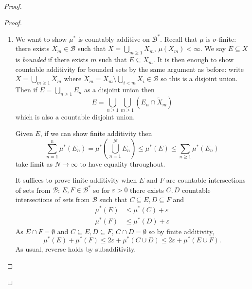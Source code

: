 \documentclass[a4paper]{article}
\begin{document}
\begin{proof}
\begin{proof}
\begin{enumerate}
\begin{proof}
          Now for the actual lemma, let \(E = \bigcap_{n \geq 1} I_n\) where \(I_n \in \mathcal B\). wlog we may assume \(I_{n + 1} \subseteq I_n\). By \(\sigma\)-finiteness assumption, \(X = \bigcup_{m \geq 1} X_m\) where \(X_m \in \mathcal B\) with \(\mu(X_m) < \infty\) so
          \[
            E = \bigcup_{m \geq 1} E \cap X_m.
          \]
          By the claim for all \(m\), \(E \cap X_m \in \mathcal B^*\) so \(E \in \mathcal B^*\).
      \end{proof}
      From the lemma we can derive that \(\mathcal B^*\) is also stable under complementation: given \(E \in \mathcal B^*\), for all \(n\) there exist \(C_n = \bigcup_{i \geq 1} B_{n, i}\) where \(B_{n, i} \in \mathcal B\) such that \(E \subseteq C_n\) and \(\mu^*(C_n \setminus E) \leq \frac{1}{n}\). Now
      \[
        E^c = (\bigcup_{n \geq 1} C_n^c) \cup (E^c \setminus \bigcup_{n \geq 1} C_n^c)
      \]
      but \(C_n^c\) is a countable intersection \(\bigcap_{i \geq 1} B_{n, i}^c\) and \(E^c \setminus \bigcup_{n \geq 1} C_n^c\) is \(\mu^*\)-null so by the lemma, \(C_n^c \in \mathcal B^*\). Therefore their union is also in \(\mathcal B^*\). Since we've shown that null sets are in \(\mathcal B^*\), \(E^c \in \mathcal B^*\).
    \item We want to show \(\mu^*\) is countably additive on \(\mathcal B^*\). Recall that \(\mu\) is \(\sigma\)-finite: there exists \(X_m \in \mathcal B\) such that \(X = \bigcup_{m \geq 1} X_m\), \(\mu(X_m) < \infty\). We say \(E \subseteq X\) is \emph{bounded} if there exists \(m\) such that \(E \subseteq X_m\). It is then enough to show countable additivity for bounded sets by the same argument as before: write \(X = \bigcup_{m \geq 1} \tilde X_m\) where \(\tilde X_m = X_m \setminus \bigcup_{i < m} X_i \in \mathcal B\) so this is a disjoint union. Then if \(E = \bigcup_{n \geq 1} E_n\) as a disjoint union then
      \[
        E = \bigcup_{n \geq 1} \bigcup_{m \geq 1} (E_n \cap \tilde X_m)
      \]
      which is also a countable disjoint union.

      Given \(E\), if we can show finite additivity then
      \[
        \sum_{n = 1}^n \mu^*(E_n)
        = \mu^*(\bigcup_{n = 1}^N E_n)
        \leq \mu^*(E)
        \leq \sum_{n \geq 1} \mu^*(E_n)
      \]
      take limit as \(N \to \infty\) to have equality throughout.
      
      It suffices to prove finite additivity when \(E\) and \(F\) are countable intersections of sets from \(\mathcal B\): \(E,F \in \mathcal B^*\) so for \(\varepsilon > 0\) there exists \(C, D\) countable intersections of sets from \(\mathcal B\) such that \(C \subseteq E, D \subseteq F\) and
      \begin{align*}
        \mu^*(E) &\leq \mu^*(C) + \varepsilon \\
        \mu^*(F) &\leq \mu^*(D) + \varepsilon
      \end{align*}
      As \(E \cap F = \emptyset\) and \(C \subseteq E, D \subseteq F\), \(C \cap D = \emptyset\) so by finite additivity,
      \[
        \mu^*(E) +\mu^*(F) \leq 2\varepsilon + \mu^*(C \cup D) \leq 2 \varepsilon + \mu^*(E \cup F).
      \]
      As usual, reverse holds by subadditivity.


\end{enumerate}
\end{proof}
\end{proof}
\end{document}
